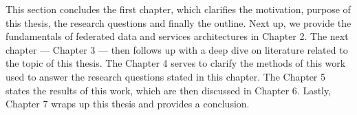 This section concludes the first chapter, which clarifies the motivation, purpose of this thesis, the research questions and finally the outline.
Next up, we provide the fundamentals of federated data and services architectures in Chapter 2.
The next chapter --- Chapter 3 --- then follows up with a deep dive on literature related to the topic of this thesis.
The Chapter 4 serves to clarify the methods of this work used to answer the research questions stated in this chapter.
The Chapter 5 states the results of this work, which are then discussed in Chapter 6.
Lastly, Chapter 7 wraps up this thesis and provides a conclusion.
